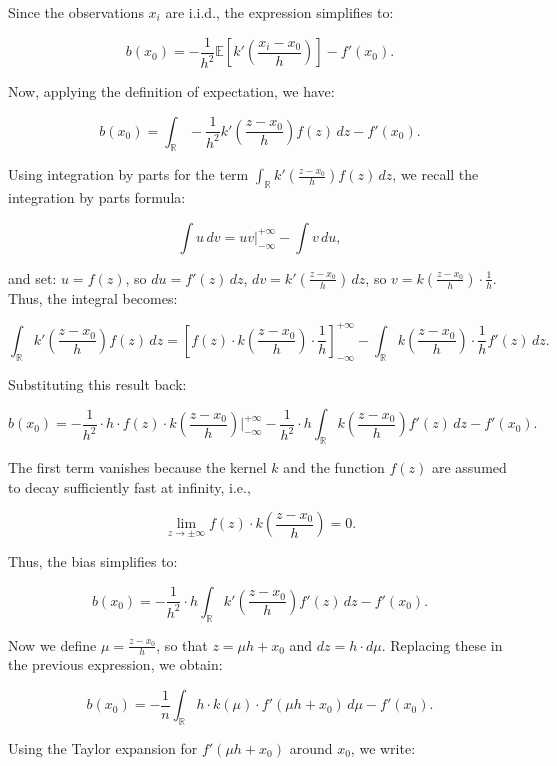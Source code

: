 \documentclass{article}
\begin{document}
Since the observations \( x_i \) are i.i.d., the expression simplifies to:

\[
b(x_0) = -\frac{1}{h^2} \mathbb{E}\left[k'\left(\frac{x_i - x_0}{h}\right)\right] - f'(x_0).
\]

Now, applying the definition of expectation, we have:

\[
b(x_0) = \int_{\mathbb{R}} -\frac{1}{h^2} k'\left(\frac{z - x_0}{h}\right) f(z) \, dz - f'(x_0).
\]

Using integration by parts for the term \(\int_{\mathbb{R}} k'\left(\frac{z - x_0}{h}\right) f(z) \, dz\), we recall the integration by parts formula:

\[
\int u \, dv = uv \Big|_{-\infty}^{+\infty} - \int v \, du,
\]

and set: \( u = f(z) \), so \( du = f'(z) \, dz \), \( dv = k'\left(\frac{z - x_0}{h}\right) \, dz \), so \( v = k\left(\frac{z - x_0}{h}\right) \cdot \frac{1}{h} \). \\

Thus, the integral becomes:

\[
\int_{\mathbb{R}} k'\left(\frac{z - x_0}{h}\right) f(z) \, dz = \left[f(z) \cdot k\left(\frac{z - x_0}{h}\right) \cdot \frac{1}{h}\right]_{-\infty}^{+\infty} - \int_{\mathbb{R}} k\left(\frac{z - x_0}{h}\right) \cdot \frac{1}{h} f'(z) \, dz.
\]

Substituting this result back:

\[
b(x_0) = -\frac{1}{h^2} \cdot h \cdot f(z) \cdot k\left(\frac{z - x_0}{h}\right) \Big|_{-\infty}^{+\infty} - \frac{1}{h^2} \cdot h \int_{\mathbb{R}} k\left(\frac{z - x_0}{h}\right) f'(z) \, dz - f'(x_0).
\]

The first term vanishes because the kernel \( k \) and the function \( f(z) \) are assumed to decay sufficiently fast at infinity, i.e.,

\[
\lim_{z \to \pm\infty} f(z) \cdot k\left(\frac{z - x_0}{h}\right) = 0.
\]

Thus, the bias simplifies to:

\[
b(x_0) = -\frac{1}{h^2} \cdot h \int_{\mathbb{R}} k'\left(\frac{z - x_0}{h}\right) f'(z) \, dz - f'(x_0).
\]

Now we define \(\mu = \frac{z - x_0}{h}\), so that \(z = \mu h + x_0\) and \(dz = h \cdot d\mu\). Replacing these in the previous expression, we obtain:

\[
b(x_0) = -\frac{1}{n} \int_{\mathbb{R}} h \cdot k(\mu) \cdot f'(\mu h + x_0) \, d\mu - f'(x_0).
\]

Using the Taylor expansion for \(f'(\mu h + x_0)\) around \(x_0\), we write:
\end{document}
